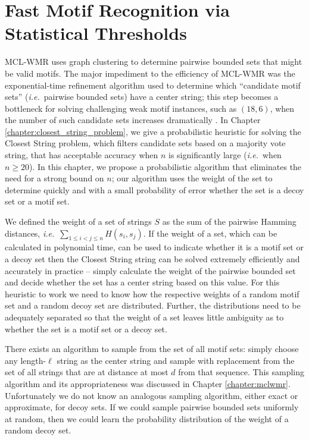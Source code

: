 \chapter{Fast Motif Recognition via Statistical Thresholds} \label{chapter:pmclwmr}


MCL-WMR uses graph clustering to determine pairwise bounded sets that might be valid motifs.  The major impediment to the efficiency of MCL-WMR was the exponential-time refinement algorithm used to determine which ``candidate motif sets'' ({\em i.e.}\ pairwise bounded sets) have a center string; this step becomes a bottleneck for solving challenging weak motif instances, such as $(18,6)$, when the number of such candidate sets increases dramatically \cite{BT02}.  In Chapter \ref{chapter:closest_string_problem}, we give a probabilistic heuristic for solving the {\sc Closest String} problem, which filters candidate sets based on a majority vote string, that has acceptable accuracy when $n$ is significantly large ({\em i.e.}\ when $n \geq 20$).  In this chapter, we propose a probabilistic algorithm that eliminates the need for a strong bound on $n$; our algorithm uses the weight of the set to determine quickly and with a small probability of error whether the set is a decoy set or a motif set.

We defined the weight of a set of strings $S$ as the sum of the pairwise Hamming distances, {\em i.e.}\ $\sum_{1\leq i<j\leq n} H(s_i, s_j)$. If the weight of a set, which can be calculated in polynomial time, can be used to indicate whether it is a motif set or a decoy set then the {\sc Closest String} string can be solved extremely efficiently and accurately in practice -- simply calculate the weight of the pairwise bounded set and decide whether the set has a center string based on this value.  For this heuristic to work we need to know how the respective weights of a random motif set and a random decoy set are distributed.  Further, the distributions need to be adequately separated so that the weight of a set leaves little ambiguity as to whether the set is a motif set or a decoy set.  

There exists an algorithm to sample from the set of all motif sets: simply choose any length-$\ell$ string as the center string and sample with replacement from the set of all strings that are at distance at most $d$ from that sequence. This sampling algorithm and its appropriateness was discussed in Chapter \ref{chapter:mclwmr}.  Unfortunately we do not know an analogous sampling algorithm, either exact or approximate, for decoy sets.  If we could sample pairwise bounded sets uniformly at random, then we could learn the probability distribution of the weight of a random decoy set.

